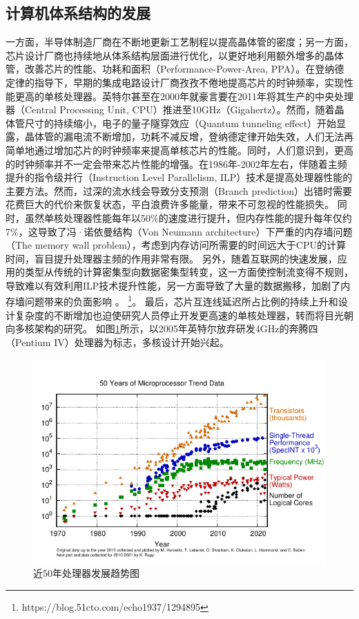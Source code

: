 \subsection{计算机体系结构的发展}

一方面，半导体制造厂商在不断地更新工艺制程以提高晶体管的密度；另一方面，芯片设计厂商也持续地从体系结构层面进行优化，以更好地利用额外增多的晶体管，改善芯片的性能、功耗和面积（Performance-Power-Area, PPA）。在登纳德定律的指导下，早期的集成电路设计厂商孜孜不倦地提高芯片的时钟频率，实现性能更高的单核处理器。英特尔甚至在2000年就豪言要在2011年将其生产的中央处理器（Central Processing Unit, CPU）推进至10GHz（Gigahertz）。然而，随着晶体管尺寸的持续缩小，电子的量子隧穿效应（Quantum tunneling effect）开始显露，晶体管的漏电流不断增加，功耗不减反增，登纳德定律开始失效，人们无法再简单地通过增加芯片的时钟频率来提高单核芯片的性能。同时，人们意识到，更高的时钟频率并不一定会带来芯片性能的增强。在1986年-2002年左右，伴随着主频提升的指令级并行（Instruction Level Parallelism, ILP）技术是提高处理器性能的主要方法。然而，过深的流水线会导致分支预测（Branch prediction）出错时需要花费巨大的代价来恢复状态，平白浪费许多能量，带来不可忽视的性能损失\cite{new_golden}。
同时，虽然单核处理器性能每年以50\%的速度进行提升，但内存性能的提升每年仅约7\%，这导致了冯·诺依曼结构（Von Neumann architecture）\cite{von_arch}下严重的内存墙问题（The memory wall problem）\cite{memory_wall}，考虑到内存访问所需要的时间远大于CPU的计算时间，盲目提升处理器主频的作用非常有限。
另外，随着互联网的快速发展，应用的类型从传统的计算密集型向数据密集型转变，这一方面使控制流变得不规则，导致难以有效利用ILP技术提升性能，另一方面导致了大量的数据搬移，加剧了内存墙问题带来的负面影响
\ifdefined\Blind
。
\else
\footnote{https://blog.51cto.com/echo1937/1294895}。
\fi
最后，芯片互连线延迟所占比例的持续上升和设计复杂度的不断增加也迫使研究人员停止开发更高速的单核处理器，转而将目光朝向多核架构的研究\cite{free_lauch_over}。
如图\ref{50yrs_processor_trend}所示\cite{50yrs_processor_trend}，以2005年英特尔放弃研发4GHz的奔腾四（Pentium IV）处理器为标志，多核设计开始兴起\cite{计算机体系结构基础}。

\begin{figure}[htb]
    \centering
    \includegraphics[width=\textwidth]{figs/50-years-processor-trend.pdf}
    \caption{近50年处理器发展趋势图}
    \label{50yrs_processor_trend}
\end{figure}

